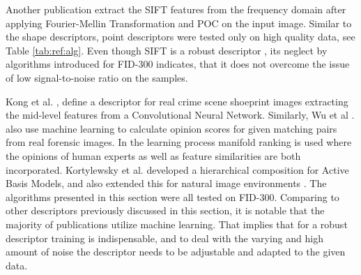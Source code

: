 \documentclass[draft,final]{vutinfth} %
\begin{document}
Another publication \cite{richetelli2017classification} extract the SIFT features from the frequency domain after applying Fourier-Mellin Transformation and POC on the input image.
Similar to the shape descriptors, point descriptors were tested only on high quality data, see Table \ref{tab:ref:alg}.
Even though SIFT is a robust descriptor  \cite{lowe1999object}, its neglect by algorithms introduced for FID-300 indicates, that it does not overcome the issue of low signal-to-noise ratio on the samples.
\par
Kong et al. \cite{kong2017cross}, \cite{kong2019cross} define a descriptor for real crime scene shoeprint images extracting the mid-level features from a Convolutional Neural Network.
Similarly, Wu et al .\cite{wu2019losgsr} also use machine learning to calculate opinion scores for given matching pairs from real forensic images.
In the learning process manifold ranking is used where the opinions of human experts as well as feature similarities are both incorporated.
Kortylewsky et al. \cite{kortylewski2016probabilistic} developed a hierarchical composition for Active Basis Models, and also extended this for natural image environments \cite{kortylewski2019greedy}.
The algorithms presented in this section were all tested on FID-300.
Comparing to other descriptors previously discussed in this section, it is notable that the majority of publications utilize machine learning.
That implies that for a robust descriptor training is indispensable, and to deal with the varying and high amount of noise the descriptor needs to be adjustable and adapted to the given data.
\end{document}
